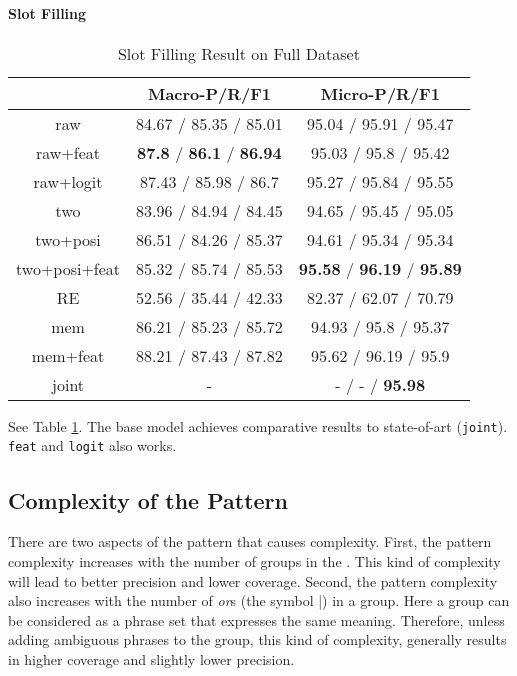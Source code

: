 \paragraph{Slot Filling}
\begin{table}
\setlength{\tabcolsep}{0.23em}
\centering
\small{
\begin{tabular}{|c|c|c|}

\hline
  & Macro-P/R/F1 & Micro-P/R/F1  \\
\hline
raw &  84.67 / 85.35 / 85.01            & 95.04 / 95.91 / 95.47  \\
\hline
raw+feat & \textbf{87.8} / \textbf{86.1} / \textbf{86.94} & 95.03 / 95.8 / 95.42  \\
\hline
raw+logit & 87.43 / 85.98 / 86.7        & 95.27 / 95.84 / 95.55  \\
\hline
two & 83.96 / 84.94 / 84.45             & 94.65 / 95.45 / 95.05 \\
\hline
two+posi & 86.51 / 84.26 / 85.37        & 94.61 / 95.34 / 95.34  \\
\hline
two+posi+feat & 85.32 / 85.74 / 85.53   & \textbf{95.58} / \textbf{96.19} / \textbf{95.89} \\
\hline
\hline
RE & 52.56 / 35.44 / 42.33 & 82.37 / 62.07 / 70.79 \\
\hline
mem & 86.21 / 85.23 / 85.72 & 94.93 / 95.8 / 95.37 \\
\hline
mem+feat & 88.21 / 87.43 / 87.82 & 95.62 / 96.19 / 95.9 \\
\hline
joint & - & - / - / \textbf{95.98} \\
\hline 

\end{tabular}
}
\caption{Slot Filling Result on Full Dataset}
\label{tab_slot_full}
\end{table}

See Table \ref{tab_slot_full}. The base model achieves comparative results to state-of-art (\texttt{joint}).
\texttt{feat} and \texttt{logit} also works. 


\subsection{Complexity of the Pattern}
There are two aspects of the pattern that causes complexity. First, the pattern complexity increases with the number of groups in the \RE. This kind of complexity will lead to better precision and lower coverage. Second, the pattern complexity also increases with the number of \emph{or}s (the symbol |) in a group. Here a group can be considered as a phrase set that expresses the same meaning. Therefore, unless adding ambiguous phrases to the group, this kind of complexity, generally results in higher coverage and slightly lower precision. 

